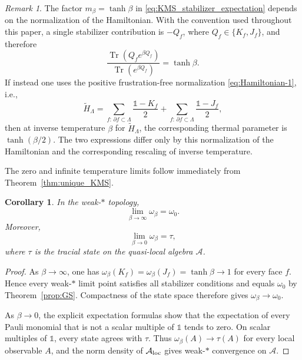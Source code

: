 \documentclass[a4paper,11pt]{article}
\newtheorem{corollary}[theorem]{Corollary}
\theoremstyle{definition}
\theoremstyle{remark}
\newtheorem{remark}{Remark}[section]
\theoremstyle{remark}
\begin{document}
\begin{remark}\label{rem:KMS_normalization}
    The factor $m_\beta=\tanh\beta$ in \eqref{eq:KMS_stabilizer_expectation} depends on the normalization of the Hamiltonian. With the convention used throughout this paper, a single stabilizer contribution is $-Q_f$, where $Q_f\in\{K_f,J_f\}$, and therefore
    \[
        \frac{\operatorname{Tr}(Q_f e^{\beta Q_f})}{\operatorname{Tr}(e^{\beta Q_f})} = \tanh\beta.
    \]
    If instead one uses the positive frustration-free normalization \eqref{eq:Hamiltonian-1}, i.e., 
    \[
        \widetilde H_\Lambda = \sum_{f:\,\partial f\subset\Lambda}\frac{\mathds{1}-K_f}{2}+\sum_{f:\,\partial f\subset\Lambda}\frac{\mathds{1}-J_f}{2},
    \]
    then at inverse temperature $\beta$ for $\widetilde H_\Lambda$, the corresponding thermal parameter is $\tanh(\beta/2)$. The two expressions differ only by this normalization of the Hamiltonian and the corresponding rescaling of inverse temperature.
\end{remark}

The zero and infinite temperature limits follow immediately from Theorem~\ref{thm:unique_KMS}.

\begin{corollary}\label{coro:KMS_limits}
    In the weak-$*$ topology,
    \begin{equation}\label{eq:KMS_zero_temperature}
        \lim_{\beta\to\infty}\omega_\beta  = \omega_0.
    \end{equation}
    Moreover,
    \begin{equation}\label{eq:KMS_infinite_temperature}
        \lim_{\beta\to0}\omega_\beta = \tau,
    \end{equation}
    where $\tau$ is the tracial state on the quasi-local algebra $\mathcal A$.
\end{corollary}

\begin{proof}
    As $\beta\to\infty$, one has $\omega_\beta(K_f)=\omega_\beta(J_f)=\tanh\beta\to1$ for every face $f$. Hence every weak-$*$ limit point satisfies all stabilizer conditions and equals $\omega_0$ by Theorem~\ref{prop:GS}. Compactness of the state space therefore gives $\omega_\beta\to\omega_0$.
    
    As $\beta\to0$, the explicit expectation formulas show that the expectation of every Pauli monomial that is not a scalar multiple of $\mathds{1}$ tends to zero. On scalar multiples of $\mathds{1}$, every state agrees with $\tau$. Thus $\omega_\beta(A)\to\tau(A)$ for every local observable $A$, and the norm density of $\mathcal A_{\rm loc}$ gives weak-$*$ convergence on $\mathcal A$.
\end{proof}
\end{document}
